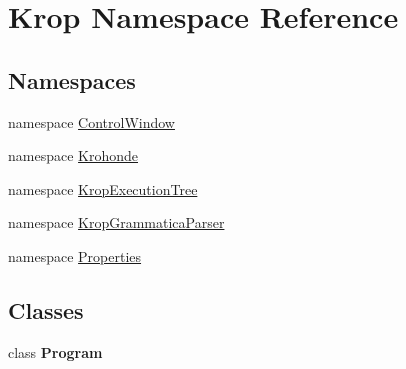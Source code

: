\hypertarget{namespace_krop}{}\section{Krop Namespace Reference}
\label{namespace_krop}
\subsection*{Namespaces}
\begin{DoxyCompactItemize}
\item 
namespace \mbox{\hyperlink{namespace_krop_1_1_control_window}{Control\+Window}}
\item 
namespace \mbox{\hyperlink{namespace_krop_1_1_krohonde}{Krohonde}}
\item 
namespace \mbox{\hyperlink{namespace_krop_1_1_krop_execution_tree}{Krop\+Execution\+Tree}}
\item 
namespace \mbox{\hyperlink{namespace_krop_1_1_krop_grammatica_parser}{Krop\+Grammatica\+Parser}}
\item 
namespace \mbox{\hyperlink{namespace_krop_1_1_properties}{Properties}}
\end{DoxyCompactItemize}
\subsection*{Classes}
\begin{DoxyCompactItemize}
\item 
class {\bfseries Program}
\end{DoxyCompactItemize}
